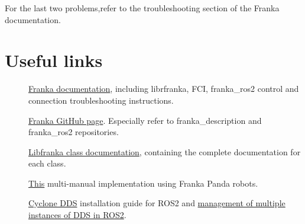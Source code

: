 \documentclass{article}
\begin{document}
For the last two problems,refer to the troubleshooting section of the Franka documentation.

\section{Useful links}
\begin{description}
    \item[] \href{https://frankarobotics.github.io/docs/index.html}{Franka documentation}, including librfranka, FCI, franka\_ros2 control and connection troubleshooting instructions.
    \item[] \href{https://github.com/frankarobotics}{Franka GitHub page}. Especially refer to franka\_description and franka\_ros2 repositories.
    \item[] \href{https://frankarobotics.github.io/libfranka/0.15.0/}{Libfranka class documentation}, containing the complete documentation for each class.
    \item[] \href{https://github.com/yilmazabdurrah/multi_franka_arm_ros2}{This} multi-manual implementation using Franka Panda robots.

    \item[] \href{https://docs.ros.org/en/humble/Installation/RMW-Implementations/DDS-Implementations/Working-with-Eclipse-CycloneDDS.html}{Cyclone DDS} installation guide for ROS2 and \href{https://docs.ros.org/en/humble/How-To-Guides/Working-with-multiple-RMW-implementations.html}{management of multiple instances of DDS in ROS2}.
\end{description}
\end{document}
